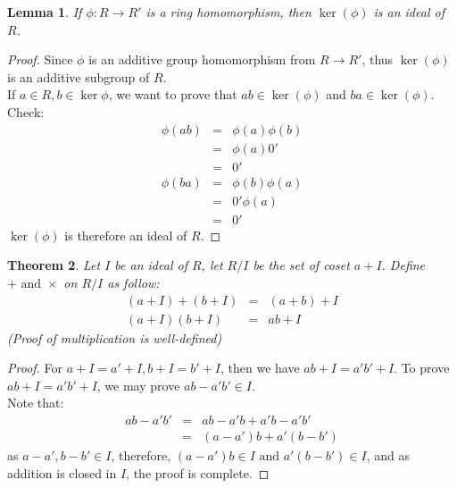\documentclass{article}
\theoremstyle{MyNonumberplain}
\theoremstyle{break}
\newtheorem*{proof}{Proof. }
\newcommand{\infixand}{\text{ and }}
\theoremstyle{break}
\newtheorem{theorem}{Theorem}[section]
\newtheorem{lemma}[theorem]{Lemma}
\theoremstyle{break}
\theoremstyle{definition}
\theoremstyle{break}
\begin{document}
\begin{thmbox}
    \begin{lemma}
        If $\phi : R \rightarrow R'$ is a ring homomorphism, then $\ker (\phi)$ is an
        ideal of $R$.
    \end{lemma}
    \begin{prfbox}
        \begin{proof}
            Since $\phi$ is an additive group homomorphism from $R \rightarrow R'$,
            thus $\ker (\phi)$ is an additive subgroup of $R$.\\
            
            If $a \in R, b \in \ker \phi$, we want to prove that $a b \in \ker (\phi)$ and
            $b a \in \ker (\phi)$.\\
            
            Check:
            \begin{eqnarray*}
              \phi (a b) & = & \phi (a) \phi (b)\\
              & = & \phi (a) 0'\\
              & = & 0'\\
              \phi (b a) & = & \phi (b) \phi (a)\\
              & = & 0' \phi (a)\\
              & = & 0'
            \end{eqnarray*}
            $\ker (\phi)$ is therefore an ideal of $R$.
        \end{proof}
    \end{prfbox}
\end{thmbox}

\begin{thmbox}
    \begin{theorem}
        Let $I$ be an ideal of $R$, let $R / I$ be the set of coset $a + I$. Define $+
        \infixand \times$ on $R / I$ as follow:
        \begin{eqnarray*}
          (a + I) + (b + I) & = & (a + b) + I\\
          (a + I) (b + I) & = & a b + I
        \end{eqnarray*}
        (Proof of multiplication is well-defined)
    \end{theorem}
    \begin{prfbox}
        \begin{proof}
            For $a + I = a' + I, b + I = b' + I$, then we have $a b + I = a' b' + I$. To
            prove $a b + I = a' b' + I$, we may prove $a b - a' b' \in I$.\\
            
            Note that:
            \begin{eqnarray*}
              a b - a' b' & = & a b - a' b + a' b - a' b'\\
              & = & (a - a') b + a' (b - b')
            \end{eqnarray*}
            as $a - a', b - b' \in I$, therefore, $(a - a') b \in I \infixand a' (b - b')
            \in I$, and as addition is closed in $I$, the proof is complete.
        \end{proof}
    \end{prfbox}
\end{thmbox}
\end{document}
